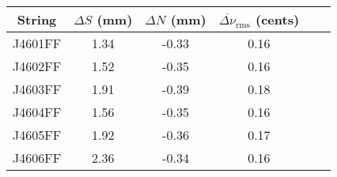 \begin{tabular}{cccccc}
\toprule
String & $\Delta S$ (mm) & $\Delta N$ (mm) & $\overline{\Delta \nu}_\text{rms}$ (cents) \\
\midrule
J4601FF & 1.34 & -0.33 & 0.16 \\
J4602FF & 1.52 & -0.35 & 0.16 \\
J4603FF & 1.91 & -0.39 & 0.18 \\
J4604FF & 1.56 & -0.35 & 0.16 \\
J4605FF & 1.92 & -0.36 & 0.17 \\
J4606FF & 2.36 & -0.34 & 0.16 \\
\bottomrule
\end{tabular}

